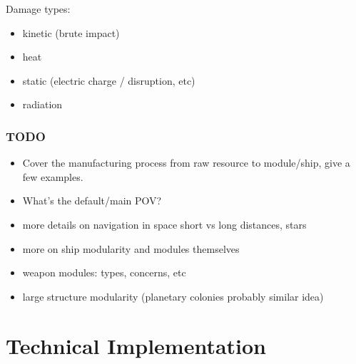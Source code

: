 \documentclass[a4paper,10pt]{article}
\begin{document}
Damage types:
\begin{itemize}
    \item kinetic (brute impact)
    \item heat
    \item static (electric charge / disruption, etc)
    \item radiation
\end{itemize}


\section{TODO}
\begin{itemize}
    \item Cover the manufacturing process from raw resource to module/ship,
    give a few examples.
    \item What's the default/main POV?
    \item more details on navigation in space short vs long distances, stars
    \item more on ship modularity and modules themselves
    \item weapon modules: types, concerns, etc
    \item large structure modularity (planetary colonies probably similar idea)
\end{itemize}

\part{Technical Implementation}
\end{document}
